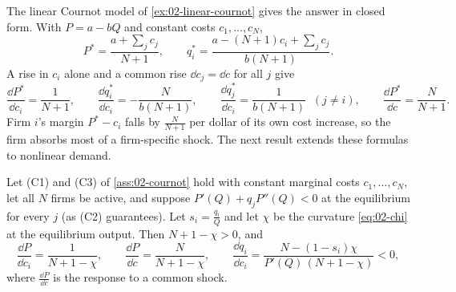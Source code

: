 The linear Cournot model of \cref{ex:02-linear-cournot} gives the answer in closed form. With $P = a - bQ$ and
constant costs $c_1, \dots, c_N$,
\begin{equation*}
P^* = \frac{a + \sum_j c_j}{N + 1}, \qquad q_i^* = \frac{a - (N + 1)c_i + \sum_j c_j}{b(N + 1)} .
\end{equation*}
A rise in $c_i$ alone and a common rise $\dd c_j = \dd c$ for all $j$ give
\begin{equation*}
\frac{\dd P^*}{\dd c_i} = \frac{1}{N + 1}, \qquad \frac{\dd q_i^*}{\dd c_i} = -\frac{N}{b(N + 1)}, \qquad
\frac{\dd q_j^*}{\dd c_i} = \frac{1}{b(N + 1)} \;\; (j \ne i), \qquad \frac{\dd P^*}{\dd c} = \frac{N}{N + 1} .
\end{equation*}
Firm $i$'s margin $P^* - c_i$ falls by $\frac{N}{N + 1}$ per dollar of its own
cost increase, so the firm absorbs most of a firm-specific shock. The next result extends these formulas to
nonlinear demand.

\begin{proposition}\label{prop:02-pt-cournot}
Let (C1) and (C3) of \cref{ass:02-cournot} hold with constant marginal costs $c_1, \dots, c_N$, let all $N$ firms
be active, and suppose $P'(Q) + q_jP''(Q) < 0$ at the equilibrium for every $j$ (as (C2) guarantees).
Let $s_i = \frac{q_i}{Q}$ and let $\chi$ be the curvature \eqref{eq:02-chi} at the equilibrium output. Then
$N + 1 - \chi > 0$, and
\begin{equation}\label{eq:02-pt-cournot}
\frac{\dd P}{\dd c_i} = \frac{1}{N + 1 - \chi}, \qquad \frac{\dd P}{\dd c} = \frac{N}{N + 1 - \chi}, \qquad
\frac{\dd q_i}{\dd c_i} = \frac{N - (1 - s_i)\chi}{P'(Q)\,(N + 1 - \chi)} < 0 ,
\end{equation}
where $\frac{\dd P}{\dd c}$ is the response to a common shock.
\end{proposition}

